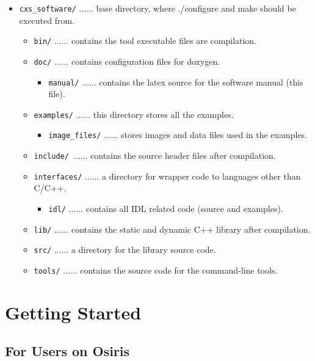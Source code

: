 \documentclass[]{cxs-software}
\begin{document}
\begin{itemize}
   \item[] {\tt cxs\_software/} ...... base directory, where ./configure and make should be executed from.
   \begin{itemize}
      \item[] {\tt bin/} ...... contains the tool executable files are compilation.
      \item[] {\tt doc/} ...... contains configuration files for doxygen.
      \begin{itemize}
         \item[] {\tt manual/} ...... contains the latex source for the software manual (this file).
      \end{itemize}
      \item[] {\tt examples/} ...... this directory stores all the examples.
      \begin{itemize}
         \item[] {\tt image\_files/} ...... stores images and data files used in the examples.
      \end{itemize}
      \item[] {\tt include/ }...... contains the source header files after compilation.
      \item[] {\tt interfaces/} ...... a directory for wrapper code to languages other than C/C++.
      \begin{itemize}
         \item[] {\tt idl/} ...... contains all IDL related code (source and examples).
      \end{itemize}
      \item[] {\tt lib/} ...... contains the static and dynamic C++ library after compilation.
      \item[] {\tt src/} ...... a directory for the library source code.
      \item[] {\tt tools/} ...... contains the source code for the command-line tools.
   \end{itemize}
\end{itemize}

\section{Getting Started}
\label{getting started}

\subsection{For Users on Osiris}
\end{document}
